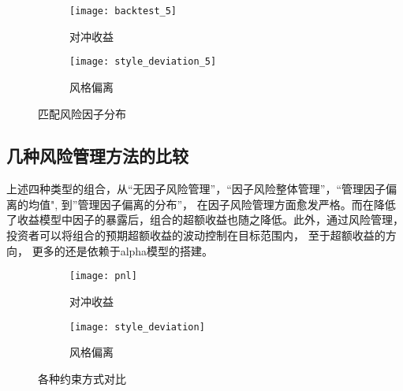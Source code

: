 \documentclass[UTF8,11pt]{ctexart}
\begin{document}
\begin{figure}
	\centering
	\begin{subfigure}[b]{0.45\textwidth}
		\centering
		\texttt{[image: backtest\_5]}
		\caption{对冲收益}
	\end{subfigure}
	\hfill
	\begin{subfigure}[b]{0.45\textwidth}
		\centering
		\texttt{[image: style\_deviation\_5]}
		\caption{风格偏离}
	\end{subfigure}
	\caption{匹配风险因子分布}
	\label{fig:figs5}
\end{figure}

\subsection{几种风险管理方法的比较}
上述四种类型的组合，从“无因子风险管理”，“因子风险整体管理”，“管理因子偏离的均值", 到”管理因子偏离的分布”， 在因子风险管理方面愈发严格。而在降低了收益模型中因子的暴露后，组合的超额收益也随之降低。此外，通过风险管理，投资者可以将组合的预期超额收益的波动控制在目标范围内， 至于超额收益的方向， 更多的还是依赖于alpha模型的搭建。

\begin{figure}
	\centering
	\begin{subfigure}[b]{0.45\textwidth}
		\centering
		\texttt{[image: pnl]}
		\caption{对冲收益}
	\end{subfigure}
	\hfill
	\begin{subfigure}[b]{0.45\textwidth}
		\centering
		\texttt{[image: style\_deviation]}
		\caption{风格偏离}
	\end{subfigure}
	\caption{各种约束方式对比}
	\label{fig:figs6}
\end{figure}

\newpage

\end{document}
